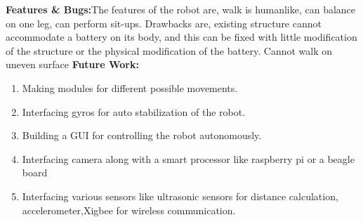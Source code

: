 \documentclass{article}
\begin{document}
\hspace{-5mm}\textbf{Features \& Bugs:}The features of the robot are, walk is humanlike, can balance on one leg, can perform sit-ups. Drawbacks are, existing structure cannot accommodate a battery on its body, and this can be fixed with little modification of the structure or the physical modification of the battery. Cannot walk on uneven surface  \newpage
\hspace{-5mm}\textbf{Future Work:}
\begin{enumerate}
	\item Making modules for different possible movements.
	\item Interfacing gyros for auto stabilization of the robot.
	\item Building a GUI for controlling the robot autonomously.
	\item Interfacing camera along with a smart processor like raspberry pi or a beagle board
	\item Interfacing various sensors like ultrasonic sensors for distance calculation, accelerometer,Xigbee for wireless communication.
\end{enumerate}
\end{document}
